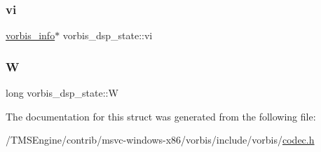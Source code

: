 \subsubsection{\texorpdfstring{vi}{vi}}
{\footnotesize\ttfamily \hyperlink{structvorbis__info}{vorbis\+\_\+info}$\ast$ vorbis\+\_\+dsp\+\_\+state\+::vi}

\mbox{\label{structvorbis__dsp__state_a1cc3a520dcf831fb967341e5095c7b38}} 
\subsubsection{\texorpdfstring{W}{W}}
{\footnotesize\ttfamily long vorbis\+\_\+dsp\+\_\+state\+::W}



The documentation for this struct was generated from the following file\+:\begin{DoxyCompactItemize}
\item 
/\+T\+M\+S\+Engine/contrib/msvc-\/windows-\/x86/vorbis/include/vorbis/\hyperlink{codec_8h}{codec.\+h}\end{DoxyCompactItemize}

